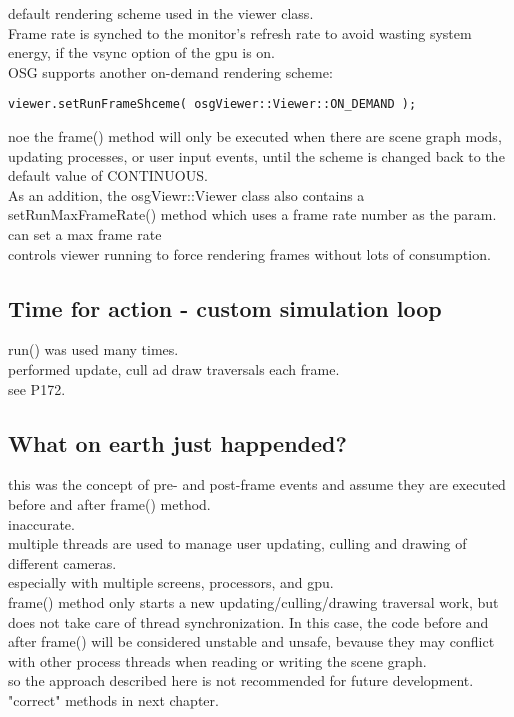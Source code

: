 \documentclass[a4paper,12pt]{book}
\begin{document}
\textrightarrow default rendering scheme used in the viewer class.\\
Frame rate is synched to the monitor's refresh rate to avoid wasting system energy, if the vsync option of the gpu is on.\\
OSG supports another on-demand rendering scheme:
\begin{lstlisting}
viewer.setRunFrameShceme( osgViewer::Viewer::ON_DEMAND );
\end{lstlisting}
noe the frame() method will only be executed when there are scene graph mods, updating processes, or user input events, until the scheme is changed back to the default value of CONTINUOUS.\\

As an addition, the osgViewr::Viewer class also contains a setRunMaxFrameRate() method which uses a frame rate number as the param.\\
\textrightarrow can set a max frame rate\\
\textrightarrow controls viewer running to force rendering frames without lots of consumption.

\subsection{Time for action - custom simulation loop}

run() was used many times.\\
\textrightarrow performed update, cull ad draw traversals each frame.\\
\textrightarrow see P172.
\subsection{What on earth just happended?}

this was the concept of pre- and post-frame events and assume they are executed before and after frame() method.\\
\textrightarrow inaccurate.\\

multiple threads are used to manage user updating, culling and drawing of different cameras.\\
\textrightarrow especially with multiple screens, processors, and gpu.\\
frame() method only starts a new updating/culling/drawing traversal work, but does not take care of thread synchronization. In this case, the code before and after frame() will be considered unstable and unsafe, bevause they may conflict with other process threads when reading or writing the scene graph.\\
\textrightarrow so the approach described here is not recommended for future development.\\
\textrightarrow "correct" methods in next chapter.\\
\end{document}
